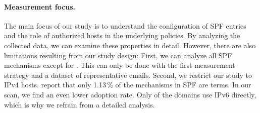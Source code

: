 \paragraph{Measurement focus.}
The main focus of our study is to understand the configuration of SPF entries and the role of authorized hosts in the underlying policies. 
By analyzing the collected data, we can examine these properties in detail. However, there are also limitations resulting from our study design:
First, we can analyze all SPF mechanisms except for .
This can only be done with the first measurement strategy and a dataset of representative emails. 
Second, we restrict our study to IPv4 hosts. 
\citeauthor{Durumeric_2015} report that only 1.13\,\% of the mechanisms in SPF are  terms. 
In our scan, we find an even lower adoption rate.
Only \IpSixDomainsPerc of the domains use IPv6 directly, which is why we refrain from a detailed analysis.






